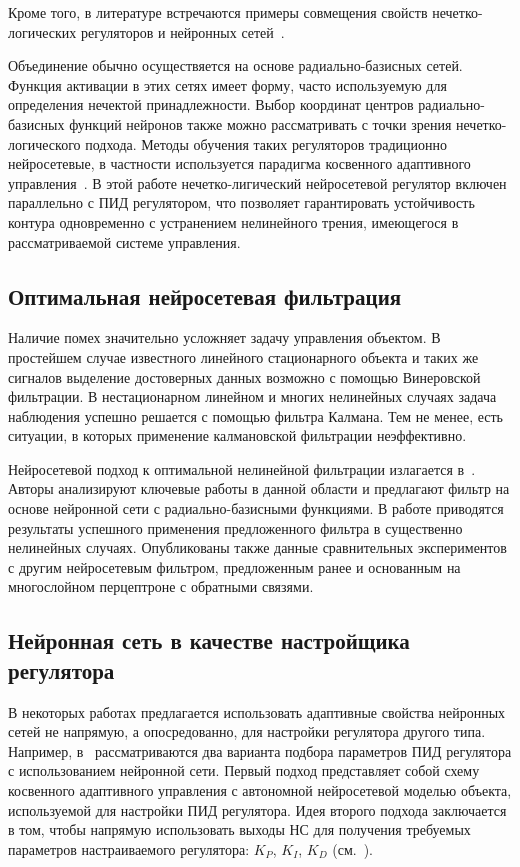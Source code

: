 Кроме того, в литературе встречаются примеры совмещения свойств
нечетко-{логичес\-ких} регуляторов и нейронных
сетей~\cite{sigom00}\cite{linwaihong01}.

Объединение обычно осуществяется на основе радиально-базисных сетей.
Функция активации в этих сетях имеет форму, часто используемую для
определения нечектой принадлежности.  Выбор координат центров
радиально-базисных функций нейронов также можно рассматривать с точки
зрения нечетко-логического подхода.  Методы обучения таких регуляторов
традиционно нейросетевые, в частности используется парадигма
косвенного адаптивного управления~\cite{wailinlin00}.  В этой работе
нечетко-лигический нейросетевой регулятор включен параллельно с ПИД
регулятором, что позволяет гарантировать устойчивость контура
одновременно с устранением нелинейного трения, имеющегося в
рассматриваемой системе управления.

\subsection{Оптимальная нейросетевая фильтрация}

Наличие помех значительно усложняет задачу управления объектом.  В
простейшем случае известного линейного стационарного объекта и таких
же сигналов выделение достоверных данных возможно с помощью
Винеровской фильтрации.  В нестационарном линейном и многих нелинейных
случаях задача наблюдения успешно решается с помощью фильтра Калмана.
Тем не менее, есть ситуации, в которых применение калмановской
фильтрации неэффективно.

Нейросетевой подход к оптимальной нелинейной фильтрации излагается
в~\cite{hayyeeder97}.  Авторы анализируют ключевые работы в данной
области и предлагают фильтр на основе нейронной сети с
радиально-базисными функциями.  В работе приводятся результаты
успешного применения предложенного фильтра в существенно нелинейных
случаях.  Опубликованы также данные сравнительных экспериментов с
другим нейросетевым фильтром, предложенным ранее и основанным на
многослойном перцептроне с обратными связями.


\subsection{Нейронная сеть в качестве настройщика регулятора}

В некоторых работах предлагается использовать адаптивные свойства
нейронных сетей не напрямую, а опосредованно, для настройки регулятора
другого типа.  Например, в~\cite{samtar96} рассматриваются два
варианта подбора параметров ПИД регулятора с использованием нейронной
сети.  Первый подход представляет собой схему косвенного адаптивного
управления с автономной нейросетевой моделью объекта, используемой для
настройки ПИД регулятора.  Идея второго подхода заключается в том,
чтобы напрямую использовать выходы НС для получения требуемых
параметров настраиваемого регулятора: $K_P$, $K_I$, $K_D$
(см.~).

